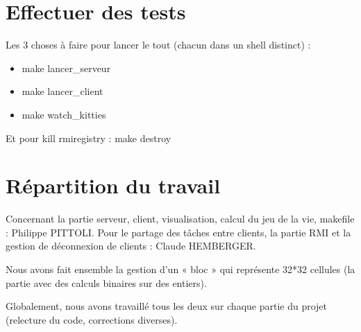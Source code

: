 \documentclass[twoside]{article}
\begin{document}
\section{Effectuer des tests}
Les 3 choses à faire pour lancer le tout (chacun dans un shell distinct) :
\begin{itemize}
	\item make lancer\_serveur
	\item make lancer\_client
	\item make watch\_kitties
\end{itemize}
Et pour kill rmiregistry :
	make destroy

\section{Répartition du travail}
Concernant la partie serveur, client, visualisation, calcul du jeu de la vie, makefile : Philippe PITTOLI.
Pour le partage des tâches entre clients, la partie RMI et la gestion de déconnexion de clients : Claude HEMBERGER.

Nous avons fait ensemble la gestion d'un « bloc » qui représente 32*32 cellules (la partie avec des calculs binaires sur des entiers).

Globalement, nous avons travaillé tous les deux sur chaque partie du projet (relecture du code, corrections diverses).
\end{document}
